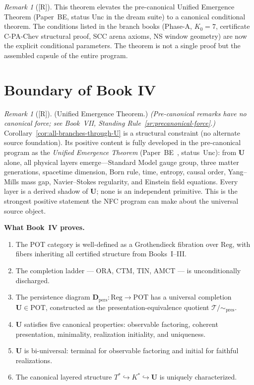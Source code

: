 \documentclass[12pt,oneside]{amsbook}
\theoremstyle{plain}
\theoremstyle{definition}
\theoremstyle{remark}
\newtheorem{remark}[theorem]{Remark}
\newcommand{\status}[1]{\textup{[#1]}}
\begin{document}
\begin{remark}[\status{R}]
This theorem elevates the pre-canonical Unified Emergence Theorem
(Paper~BE, status Unc in the dream suite) to a canonical
conditional theorem.  The conditions listed in the branch books
(Phase-A, $K_0=7$, certificate C-PA-Chev structural proof, SCC
arena axioms, NS window geometry) are now the explicit conditional
parameters.  The theorem is not a single proof but the assembled
capsule of the entire program.
\end{remark}

\section{Boundary of Book IV}

\begin{remark}[\status{R}]
\textup{(Unified Emergence Theorem.)}
\textit{(Pre-canonical remarks have no canonical force;
see Book~VII, Standing Rule~\ref{sr:precanonical-force}.)}  
Corollary~\ref{cor:all-branches-through-U} is a structural constraint
(no alternate source foundation).  Its positive content is fully
developed in the pre-canonical program as the \emph{Unified Emergence
Theorem} (Paper~BE~\cite{dreamSuite}, status~Unc): from $\mathbf{U}$
alone, all physical layers emerge---Standard Model gauge group, three
matter generations, spacetime dimension, Born rule, time, entropy,
causal order, Yang--Mills mass gap, Navier--Stokes regularity, and
Einstein field equations.  Every layer is a derived shadow of
$\mathbf{U}$; none is an independent primitive.  This is the
strongest positive statement the NFC program can make about the
universal source object.
\end{remark}

\textbf{What Book~IV proves.}
\begin{enumerate}
  \item The POT category is well-defined as a Grothendieck fibration
        over $\mathrm{Reg}$, with fibers inheriting all certified
        structure from Books~I--III.
  \item The completion ladder --- ORA, CTM, TIN, AMCT --- is
        unconditionally discharged.
  \item The persistence diagram
        $\mathbf{D}_{\mathrm{pers}}: \mathrm{Reg} \to \mathrm{POT}$
        has a universal completion $\mathbf{U} \in \mathrm{POT}$,
        constructed as the presentation-equivalence quotient
        $\mathcal{T}/{\sim_{\mathrm{pres}}}$.
  \item $\mathbf{U}$ satisfies five canonical properties: observable
        factoring, coherent presentation, minimality, realization
        initiality, and uniqueness.
  \item $\mathbf{U}$ is bi-universal: terminal for observable factoring
        and initial for faithful realizations.
  \item The canonical layered structure $T^* \hookrightarrow K^*
        \hookrightarrow \mathbf{U}$ is uniquely characterized.
\end{enumerate}
\end{document}
